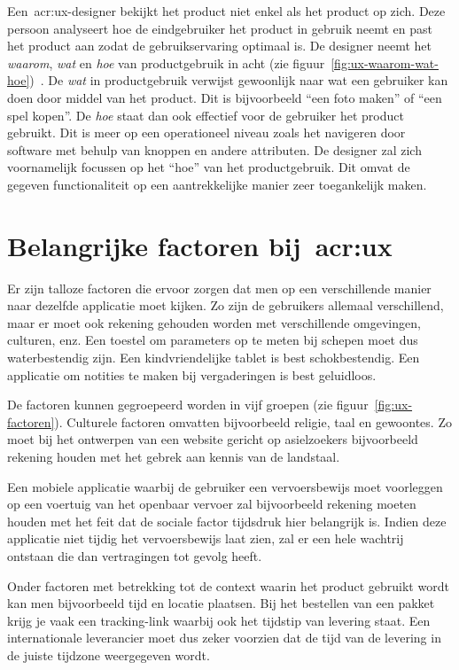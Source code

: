 Een~\acrshort{acr:ux}-designer bekijkt het product niet enkel als het product op zich. Deze persoon analyseert hoe de eindgebruiker het product in gebruik neemt en past het product aan zodat de gebruikservaring optimaal is. De designer neemt het \textit{waarom}, \textit{wat} en \textit{hoe} van productgebruik in acht (zie figuur~\ref{fig:ux-waarom-wat-hoe})~\autocite{Hassenzahl2013}. De \textit{wat} in productgebruik verwijst gewoonlijk naar wat een gebruiker kan doen door middel van het product. Dit is bijvoorbeeld ``een foto maken'' of ``een spel kopen''. De \textit{hoe} staat dan ook effectief voor de gebruiker het product gebruikt. Dit is meer op een operationeel niveau zoals het navigeren door software met behulp van knoppen en andere attributen. De designer zal zich voornamelijk focussen op het ``hoe'' van het productgebruik. Dit omvat de gegeven functionaliteit op een aantrekkelijke manier zeer toegankelijk maken.

\section{Belangrijke factoren bij~\acrlong{acr:ux}}
\label{sec:belangrijke-factoren-bij-user-experience}

Er zijn talloze factoren die ervoor zorgen dat men op een verschillende manier naar dezelfde applicatie moet kijken. Zo zijn de gebruikers allemaal verschillend, maar er moet ook rekening gehouden worden met verschillende omgevingen, culturen, enz. Een toestel om parameters op te meten bij schepen moet dus waterbestendig zijn. Een kindvriendelijke tablet is best schokbestendig. Een applicatie om notities te maken bij vergaderingen is best geluidloos.

De factoren kunnen gegroepeerd worden in vijf groepen (zie figuur~\ref{fig:ux-factoren}). Culturele factoren omvatten bijvoorbeeld religie, taal en gewoontes. Zo moet bij het ontwerpen van een website gericht op asielzoekers bijvoorbeeld rekening houden met het gebrek aan kennis van de landstaal.

Een mobiele applicatie waarbij de gebruiker een vervoersbewijs moet voorleggen op een voertuig van het openbaar vervoer zal bijvoorbeeld rekening moeten houden met het feit dat de sociale factor tijdsdruk hier belangrijk is. Indien deze applicatie niet tijdig het vervoersbewijs laat zien, zal er een hele wachtrij ontstaan die dan vertragingen tot gevolg heeft.

Onder factoren met betrekking tot de context waarin het product gebruikt wordt kan men bijvoorbeeld tijd en locatie plaatsen. Bij het bestellen van een pakket krijg je vaak een tracking-link waarbij ook het tijdstip van levering staat. Een internationale leverancier moet dus zeker voorzien dat de tijd van de levering in de juiste tijdzone weergegeven wordt.

